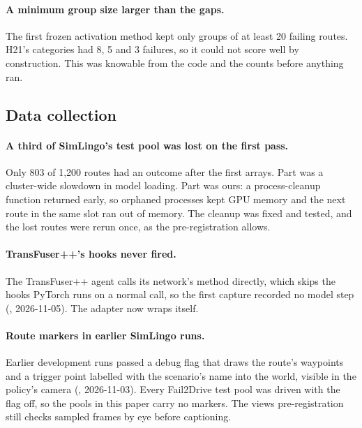 \paragraph{A minimum group size larger than the gaps.}
The first frozen activation method kept only groups of at least 20 failing
routes. H21's categories had
8, 5 and 3 failures, so it could not score well by construction. This was
knowable from the code and the counts before anything ran.

\subsection{Data collection}

\paragraph{A third of SimLingo's test pool was lost on the first pass.}
Only 803 of 1,200 routes had an outcome after the first arrays. Part was a
cluster-wide slowdown in model loading. Part was ours: a process-cleanup
function returned early, so orphaned processes kept GPU memory and the next
route in the same slot ran out of memory. The cleanup was fixed and tested, and
the lost routes were rerun once, as the pre-registration allows.

\paragraph{TransFuser++'s hooks never fired.}
The TransFuser++ agent calls its network's  method directly, which
skips the hooks PyTorch runs on a normal call, so the first capture recorded no
model step (, 2026-11-05). The adapter now wraps
 itself.

\paragraph{Route markers in earlier SimLingo runs.}
Earlier development runs passed a debug flag that draws the route's waypoints and
a trigger point labelled with the scenario's name into the world, visible in the
policy's camera (, 2026-11-03). Every Fail2Drive test pool
was driven with the flag off, so the pools in this paper carry no markers. The
views pre-registration still checks sampled frames by eye before captioning.

